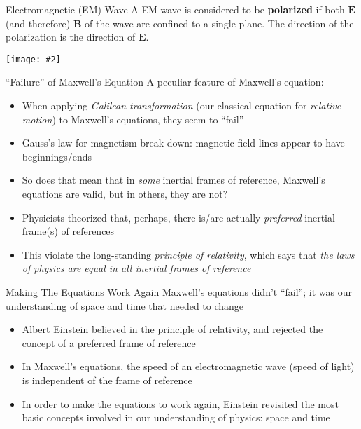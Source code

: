 \documentclass[12pt,aspectratio=169]{beamer}
\newcommand{\pic}[2]{\texttt{[image: \#2]}}\newcommand{\mb}[1]{\mathbf{#1}}
\begin{document}
\begin{frame}{Electromagnetic (EM) Wave}
  A EM wave is considered to be \textbf{polarized} if both $\mb{E}$
  (and therefore) $\mb{B}$ of the wave are confined to a single plane. The
  direction of the polarization is the direction of $\mb{E}$.
  \begin{center}
    \pic{.4}{em-20field.png}
  \end{center}
\end{frame}



\begin{frame}{``Failure'' of Maxwell's Equation}
  A peculiar feature of Maxwell's equation:
  \begin{itemize}
  \item When applying \emph{Galilean transformation} (our classical equation for
    \emph{relative motion}) to Maxwell's equations, they seem to ``fail''
  \item Gauss's law for magnetism break down: magnetic field lines appear to
    have beginnings/ends
  \item So does that mean that in \emph{some} inertial frames of reference,
    Maxwell's equations are valid, but in others, they are not?
  \item Physicists theorized that, perhaps, there is/are actually
    \emph{preferred} inertial frame(s) of references
  \item This violate the long-standing
    \emph{principle of relativity}, which says that
    \emph{the laws of physics are equal in all inertial frames of reference}
  \end{itemize}
\end{frame}



\begin{frame}{Making The Equations Work Again}
  Maxwell's equations didn't ``fail''; it was our understanding of space and
  time that needed to change
  \begin{itemize}
  \item Albert Einstein believed in the principle of relativity, and rejected
    the concept of a preferred frame of reference
  \item In Maxwell's equations, the speed of an electromagnetic wave (speed of
    light) is independent of the frame of reference
  \item In order to make the equations to work again, Einstein revisited the
    most basic concepts involved in our understanding of physics: space and
    time
  \end{itemize}
\end{frame}
\end{document}
